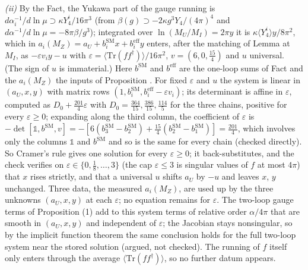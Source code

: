 \emph{(ii)} By the Fact, the Yukawa part of the gauge running is $d\alpha_{i}^{-1}/d\ln\mu \supset \kappa Y_{4}^{i}/16\pi^{3}$ (from $\beta(g) \supset -2\kappa g^{3}Y_{4}/(4\pi)^{4}$ and $d\alpha^{-1}/d\ln\mu = -8\pi\beta/g^{3}$); integrated over $\ln(M_{U}/M_{I}) = 2\pi y$ it is $\kappa\langle Y_{4}^{i}\rangle y/8\pi^{2}$, which in $a_{i}(M_{Z}) = a_{U} + b^{\mathrm{SM}}_{i}x + b^{\mathrm{eff}}_{i}y$ enters, after the matching of Lemma  at $M_{I}$, as $-\varepsilon v_{i}y - u$ with $\varepsilon = \langle\mathrm{Tr}(ff^{\dagger})\rangle/16\pi^{2}$, $v = (6, 0, \tfrac{15}{4})$ and $u$ universal. (The sign of $u$ is immaterial.) Here $b^{\mathrm{SM}}$ and $b^{\mathrm{eff}}$ are the one-loop sums of Fact  and the $a_{i}(M_{Z})$ the inputs of Proposition . For fixed $\varepsilon$ and $u$ the system is linear in $(a_{U}, x, y)$ with matrix rows $(1, b^{\mathrm{SM}}_{i}, b^{\mathrm{eff}}_{i} - \varepsilon v_{i})$; its determinant is affine in $\varepsilon$, computed as $D_{0} + \tfrac{201}{4}\varepsilon$ with $D_{0} = \tfrac{364}{15}, \tfrac{386}{15}, \tfrac{114}{5}$ for the three chains, positive for every $\varepsilon \ge 0$; expanding along the third column, the coefficient of $\varepsilon$ is $-\det[\mathbb{1}, b^{\mathrm{SM}}, v] = -[6(b^{\mathrm{SM}}_{3} - b^{\mathrm{SM}}_{2}) + \tfrac{15}{4}(b^{\mathrm{SM}}_{2} - b^{\mathrm{SM}}_{1})] = \tfrac{201}{4}$, which involves only the columns $\mathbb{1}$ and $b^{\mathrm{SM}}$ and so is the same for every chain (checked directly). So Cramer's rule gives one solution for every $\varepsilon \ge 0$; it back-substitutes, and the check verifies on $\varepsilon \in \{0, \tfrac18, \dots, 3\}$ (the cap $\varepsilon \le 3$ is singular values of $f$ at most $4\pi$) that $x$ rises strictly, and that a universal $u$ shifts $a_{U}$ by $-u$ and leaves $x$, $y$ unchanged. Three data, the measured $a_{i}(M_{Z})$, are used up by the three unknowns $(a_{U}, x, y)$ at each $\varepsilon$; no equation remains for $\varepsilon$. The two-loop gauge terms of Proposition (1) add to this system terms of relative order $\alpha/4\pi$ that are smooth in $(a_{U}, x, y)$ and independent of $\varepsilon$; the Jacobian stays nonsingular, so by the implicit function theorem the same conclusion holds for the full two-loop system near the stored solution (argued, not checked). The running of $f$ itself only enters through the average $\langle\mathrm{Tr}(ff^{\dagger})\rangle$, so no further datum appears.

